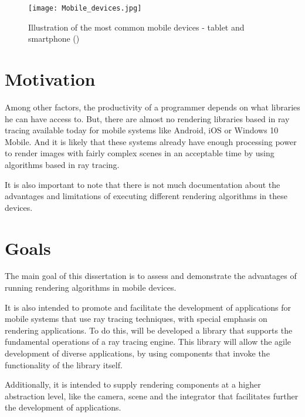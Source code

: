 \begin{figure}[H]
\centering
\caption{Illustration of the most common mobile devices - tablet and smartphone (\cite{JournalDuNet})}
\label{Illustration of the most common mobile devices - tablet and smartphone}
\texttt{[image: Mobile\_devices.jpg]}
\end{figure}

\section{Motivation}

\par
Among other factors, the productivity of a programmer depends on what libraries he can have access to.
But, there are almost no rendering libraries based in ray tracing available today for mobile systems like Android, iOS or Windows 10 Mobile.
And it is likely that these systems already have enough processing power to render images with fairly complex scenes in an acceptable time by using algorithms based in ray tracing.

\par
It is also important to note that there is not much documentation about the advantages and limitations of executing different rendering algorithms in these devices.

\section{Goals}

\par
The main goal of this dissertation is to assess and demonstrate the advantages of running rendering algorithms in mobile devices.

\par
It is also intended to promote and facilitate the development of applications for mobile systems that use ray tracing techniques, with special emphasis on rendering applications.
To do this, will be developed a library that supports the fundamental operations of a ray tracing engine.
This library will allow the agile development of diverse applications, by using components that invoke the functionality of the library itself.

\par
Additionally, it is intended to supply rendering components at a higher abstraction level, like the camera, scene and the integrator that facilitates further the development of applications.

